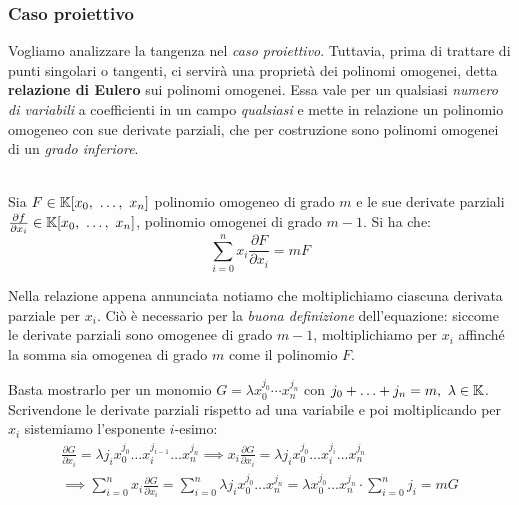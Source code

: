 \subsubsection{Caso proiettivo}
Vogliamo analizzare la tangenza nel \textit{caso proiettivo}. Tuttavia, prima di trattare di punti singolari o tangenti, ci servirà una proprietà dei polinomi omogenei, detta \textbf{relazione di Eulero} sui polinomi omogenei. Essa vale per un qualsiasi \textit{numero di variabili} a coefficienti in un campo \textit{qualsiasi} e mette in relazione un polinomio omogeneo con sue derivate parziali, che per costruzione sono polinomi omogenei di un \textit{grado inferiore}.
\begin{theorema}~{}\\
Sia $F\in\mathbb{K}[x_0,\ \ldots,\ x_n]$ polinomio omogeneo di grado $m$ e le sue derivate parziali $\frac{\partial{f}}{\partial{x_i}}\in\kamp[x_0,\ \ldots,\ x_n]$, polinomio omogenei di grado $m-1$. Si ha che:
		\begin{equation}
			\sum_{i=0}^n x_i\frac{\partial{F}}{\partial{x_i}}=mF
		\end{equation}
	\vspace{-6mm}
\end{theorema}
Nella relazione appena annunciata notiamo che moltiplichiamo ciascuna derivata parziale per $x_i$. Ciò è necessario per la \textit{buona definizione} dell'equazione: siccome le derivate parziali sono omogenee di grado $m-1$, moltiplichiamo per $x_i$ affinché la somma sia omogenea di grado $m$ come il polinomio $F$.
\begin{demonstration}
	Basta mostrarlo per un monomio $G=\lambda x_0^{j_0}\cdots x_n^{j_n}$ con $j_0+\ldots+j_n=m,\ \lambda\in\kamp$. Scrivendone le derivate parziali rispetto ad una variabile e poi moltiplicando per $x_i$ sistemiamo l'esponente $i$-esimo:
		\begin{gather*}
			\frac{\partial{G}}{\partial{x_i}}=\lambda j_i x_0^{j_0}\ldots x_i^{j_{i-1}} \ldots x_n^{j_n} \implies  x_i \frac{\partial{G}}{\partial{x_i}}=\lambda j_i x_0^{j_0}\ldots x_i^{j_i} \ldots x_n^{j_n}\\
			\implies \sum_{i=0}^n x_i\frac{\partial{G}}{\partial{x_i}} = \sum_{i=0}^n \lambda j_i x_0^{j_0} \ldots x_n^{j_n}=\lambda x_0^{j_0}\ldots x_n^{j_n} \cdot \sum_{i=0}^n j_i =mG
		\end{gather*}
\end{demonstration}
